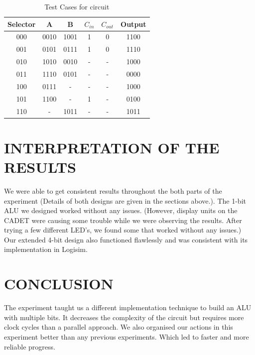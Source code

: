 \documentclass[pdftex,12pt,a4paper]{article}
\begin{document}
\begin{flushleft}
\begin{table}[]
    \centering
    \begin{tabular}{c|c|c|c|c|c}
         Selector & A & B & $C_{in}$ & $C_{out}$ & Output  \\ \hline
         000 & 0010 & 1001 & 1 & 0 & 1100 \\   
         001 & 0101 & 0111 & 1 & 0 & 1110 \\   
         010 & 1010 & 0010 & - & - & 1000 \\  
         011 & 1110 & 0101 & - & - & 0000 \\
         100 & 0111 & - & - & - & 1000 \\  
         101 & 1100 & - & 1 & - & 
         0100 \\
         110 & - & 1011 & - & - & 1011 \\
    \end{tabular}
    \caption{Test Cases for circuit}
    \label{tab:my_label}
\end{table}



\end{flushleft}


\newpage
\section{INTERPRETATION OF THE RESULTS}
We were able to get consistent results throughout the both parts of the experiment (Details of both designs are given in the sections above.). The 1-bit ALU we designed worked without any issues. (However, display units on the CADET were causing some trouble while we were observing the results. After trying a few different LED's, we found some that worked without any issues.) Our extended 4-bit design also functioned flawlessly and was consistent with its implementation in Logisim.

\section{CONCLUSION}
The experiment taught us a different implementation technique to build an ALU with multiple bits. It decreases the complexity of the circuit but requires more clock cycles than a parallel approach. We also organised our actions in this experiment better than any previous experiments. Which led to faster and more reliable progress.

\newpage
{}



\end{document}
